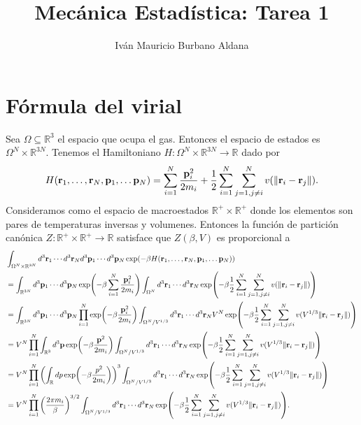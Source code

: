 \documentclass{article}
\title{Mecánica Estadística: Tarea 1}
\author{Iván Mauricio Burbano Aldana}
\begin{document}
\maketitle

\section{Fórmula del virial}

Sea $\Omega\subseteq\mathbb{R}^3$ el espacio que ocupa el gas. Entonces el espacio de estados es $\Omega^N\times\mathbb{R}^{3N}$. Tenemos el Hamiltoniano $H:\Omega^N\times\mathbb{R}^{3N}\rightarrow\mathbb{R}$ dado por
\begin{equation}
H(\vb{r}_1,\dots,\vb{r}_N,\vb{p}_1,\dots\vb{p}_N)=\sum_{i=1}^N\frac{\vb{p}_i^2}{2m_i}+\frac{1}{2}\sum_{i=1}^N\sum_{j=1,j\neq i}^Nv(\|\vb{r}_i-\vb{r}_j\|).
\end{equation}
Consideramos como el espacio de macroestados $\mathbb{R}^+\times\mathbb{R}^+$ donde los elementos son pares de temperaturas inversas y volumenes. Entonces la función de partición canónica $Z:\mathbb{R}^+\times\mathbb{R}^+\rightarrow\mathbb{R}$ satisface que $Z(\beta,V)$ es proporcional a
\begin{align}
\begin{split}
&\int_{\Omega^N\times\mathbb{R}^{3N}}d^3\vb{r}_1\cdots d^3\vb{r}_Nd^3\vb{p}_1\cdots d^3\vb{p}_N\exp(-\beta H(\vb{r}_1,\dots,\vb{r}_N,\vb{p}_1,\dots\vb{p}_N))\\
&=\int_{\mathbb{R}^{3N}}d^3\vb{p}_1\cdots d^3\vb{p}_N\exp(-\beta\sum_{i=1}^N\frac{\vb{p}_i^2}{2m_i})\int_{\Omega^N}d^3\vb{r}_1\cdots d^3\vb{r}_N\exp(-\beta\frac{1}{2}\sum_{i=1}^N\sum_{j=1,j\neq i}^Nv(\|\vb{r}_i-\vb{r}_j\|))\\
&=\int_{\mathbb{R}^{3N}}d^3\vb{p}_1\cdots d^3\vb{p}_N\prod_{i=1}^N\exp(-\beta\frac{\vb{p}_i^2}{2m_i})\int_{\Omega^N/V^{1/3}}d^3\vb{r}_1\cdots d^3\vb{r}_NV^N\exp(-\beta\frac{1}{2}\sum_{i=1}^N\sum_{j=1,j\neq i}^Nv(V^{1/3}\|\vb{r}_i-\vb{r}_j\|))\\
&=V^N\prod_{i=1}^N\int_{\mathbb{R}^3}d^3\vb{p}\exp(-\beta\frac{\vb{p}^2}{2m_i})\int_{\Omega^N/V^{1/3}}d^3\vb{r}_1\cdots d^3\vb{r}_N\exp(-\beta\frac{1}{2}\sum_{i=1}^N\sum_{j=1,j\neq i}^Nv(V^{1/3}\|\vb{r}_i-\vb{r}_j\|))\\
&=V^N\prod_{i=1}^N\qty(\int_{\mathbb{R}}dp\exp(-\beta\frac{p^2}{2m_i}))^3\int_{\Omega^N/V^{1/3}}d^3\vb{r}_1\cdots d^3\vb{r}_N\exp(-\beta\frac{1}{2}\sum_{i=1}^N\sum_{j=1,j\neq i}^Nv(V^{1/3}\|\vb{r}_i-\vb{r}_j\|))\\
&=V^N\prod_{i=1}^N\qty(\frac{2\pi m_i}{\beta})^{3/2}\int_{\Omega^N/V^{1/3}}d^3\vb{r}_1\cdots d^3\vb{r}_N\exp(-\beta\frac{1}{2}\sum_{i=1}^N\sum_{j=1,j\neq i}^Nv(V^{1/3}\|\vb{r}_i-\vb{r}_j\|)).
\end{split}
\end{align}
\end{document}
